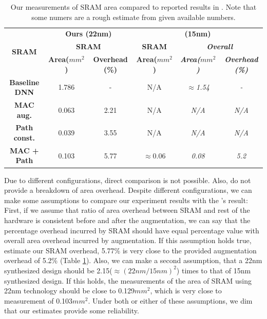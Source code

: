 \documentclass[11pt]{article}
\begin{document}
\begin{table}[H]
    \begin{tabular}{|ccc|ccc|}
    \hline
    \multirow{3}{*}{\textbf{SRAM}} & \multicolumn{2}{c|}{\textbf{Ours (22nm)}} & \multicolumn{3}{c|}{\textbf{\citet{ptolemy} (15nm)}} \\ \cline{2-6} 
     & \multicolumn{2}{c|}{\textbf{SRAM}} & \textbf{SRAM} & \multicolumn{2}{c|}{\textit{\textbf{Overall}}} \\ \cline{2-6} 
     & \textbf{Area($mm^2$)} & \textbf{Overhead (\%)} & \textbf{Area($mm^2$)} & \textit{\textbf{Area($mm^2$)}} & \textit{\textbf{Overhead (\%)}} \\ \hline
    \textbf{Baseline DNN} & 1.786 & - & N/A & \textit{$\approx$1.54} & \textit{-} \\ \hline
    \textbf{MAC aug.} & 0.063 & 2.21 & N/A & \textit{N/A} & \textit{N/A} \\
    \textbf{Path const.} & 0.039 & 3.55 & N/A & \textit{N/A} & \textit{N/A} \\ \hline
    \textbf{MAC + Path} & 0.103 & 5.77 & $\approx$0.06 & \textit{0.08} & \textit{5.2} \\ \hline
    
    \end{tabular}
    \caption{Our measurements of SRAM area compared to reported results in \cite{ptolemy}. Note that some numers are a rough estimate from given available numbers. \label{tab:sram-area}}
\end{table}

Due to different configurations, direct comparison is not possible. Also, \citeauthor{ptolemy} do not provide a breakdown of area overhead. Despite different configurations, we can make some assumptions to compare our experiment results with the \cite{ptolemy}'s result: First, if we assume that ratio of area overhead between SRAM and rest of the hardware is consistent before and after the augmentation, we can say that the percentage overhead incurred by SRAM should have equal percentage value with overall area overhead incurred by augmentation. If this assumption holds true, estimate our SRAM overhead, 5.77\% is very close to the provided augmentation overhead of 5.2\% (Table \ref{tab:sram-area}). Also, we can make a second assumption, that a 22nm synthesized design should be 2.15($\approx(22nm/15nm)^2$) times to that of 15nm synthesized design. If this holds, the measurements of the area of SRAM using 22nm technology should be close to 0.129$mm^2$, which is very close to measurement of 0.103$mm^2$. Under both or either of these assumptions, we dim that our estimates provide some reliability.
\end{document}
